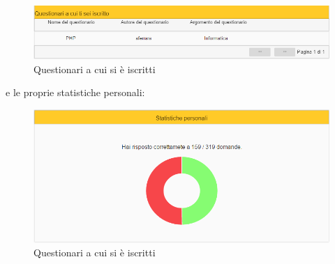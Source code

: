 \label{QuestionariIscritto}
\begin{figure}[ht]
	\centering
	\includegraphics[scale=0.45]{img/questionari_iscritto.png}
	\caption{Questionari a cui si è iscritti}
\end{figure}
\FloatBarrier

e le proprie statistiche personali:

\label{StatistichePersonali}
\begin{figure}[ht]
	\centering
	\includegraphics[scale=0.45]{img/statistiche_personali.png}
	\caption{Questionari a cui si è iscritti}
\end{figure}
\FloatBarrier
